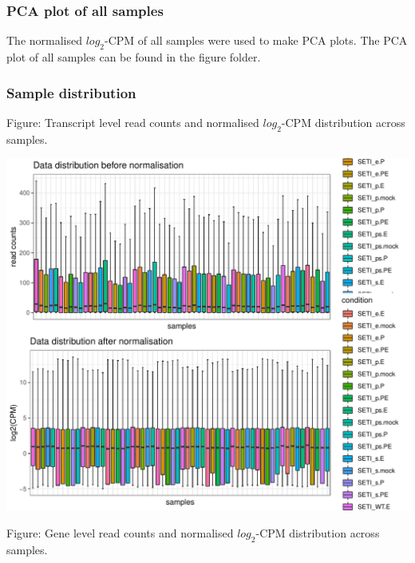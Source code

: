 \documentclass[]{article}
\begin{document}
\subsubsection{PCA plot of all samples}\label{pca-plot-of-all-samples}

The normalised \(log_2\)-CPM of all samples were used to make PCA plots.
The PCA plot of all samples can be found in the figure folder.

\subsubsection{Sample distribution}\label{sample-distribution}

Figure: Transcript level read counts and normalised \(log_2\)-CPM
distribution across samples.

\includegraphics[width=16.67in]{X2024.08.05.11.24.04.j284/figure/Transcript expression distribution}

Figure: Gene level read counts and normalised \(log_2\)-CPM distribution
across samples.
\end{document}

